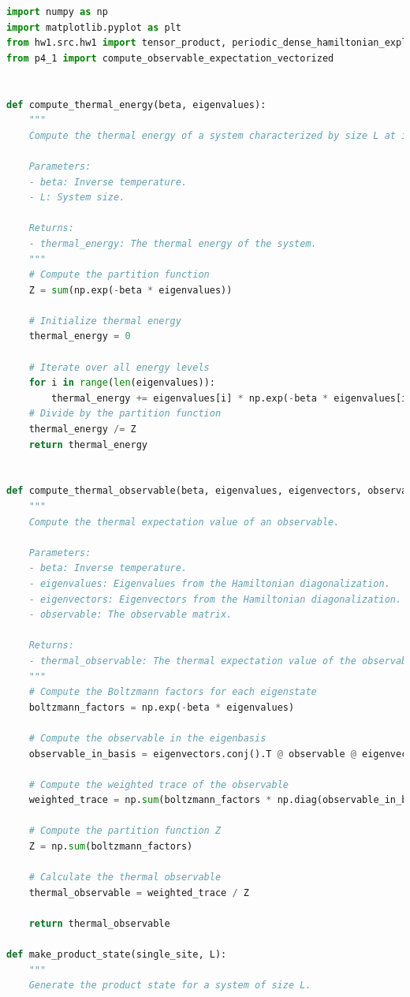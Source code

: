 \documentclass[12pt]{article}
\begin{document}
\begin{lstlisting}[language=Python]
import numpy as np
import matplotlib.pyplot as plt
from hw1.src.hw1 import tensor_product, periodic_dense_hamiltonian_explicit
from p4_1 import compute_observable_expectation_vectorized


def compute_thermal_energy(beta, eigenvalues):
    """
    Compute the thermal energy of a system characterized by size L at inverse temperature beta.
    
    Parameters:
    - beta: Inverse temperature.
    - L: System size.
    
    Returns:
    - thermal_energy: The thermal energy of the system.
    """
    # Compute the partition function
    Z = sum(np.exp(-beta * eigenvalues))
    
    # Initialize thermal energy
    thermal_energy = 0
    
    # Iterate over all energy levels
    for i in range(len(eigenvalues)):
        thermal_energy += eigenvalues[i] * np.exp(-beta * eigenvalues[i])
    # Divide by the partition function
    thermal_energy /= Z
    return thermal_energy


def compute_thermal_observable(beta, eigenvalues, eigenvectors, observable):
    """
    Compute the thermal expectation value of an observable.
    
    Parameters:
    - beta: Inverse temperature.
    - eigenvalues: Eigenvalues from the Hamiltonian diagonalization.
    - eigenvectors: Eigenvectors from the Hamiltonian diagonalization.
    - observable: The observable matrix.
    
    Returns:
    - thermal_observable: The thermal expectation value of the observable.
    """
    # Compute the Boltzmann factors for each eigenstate
    boltzmann_factors = np.exp(-beta * eigenvalues)
    
    # Compute the observable in the eigenbasis
    observable_in_basis = eigenvectors.conj().T @ observable @ eigenvectors
    
    # Compute the weighted trace of the observable
    weighted_trace = np.sum(boltzmann_factors * np.diag(observable_in_basis))
    
    # Compute the partition function Z
    Z = np.sum(boltzmann_factors)
    
    # Calculate the thermal observable
    thermal_observable = weighted_trace / Z
    
    return thermal_observable

def make_product_state(single_site, L):
    """
    Generate the product state for a system of size L.
    

\end{lstlisting}
\end{document}
